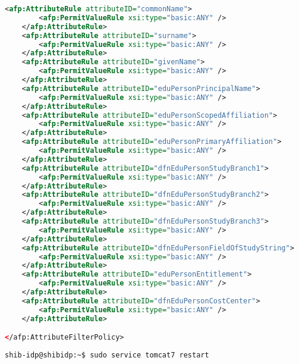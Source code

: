 \begin{lstlisting}[language=xml]
	<afp:AttributeRule attributeID="commonName">
		<afp:PermitValueRule xsi:type="basic:ANY" />
	</afp:AttributeRule>
	<afp:AttributeRule attributeID="surname">
		<afp:PermitValueRule xsi:type="basic:ANY" />
	</afp:AttributeRule>
	<afp:AttributeRule attributeID="givenName">
		<afp:PermitValueRule xsi:type="basic:ANY" />
	</afp:AttributeRule>
	<afp:AttributeRule attributeID="eduPersonPrincipalName">
		<afp:PermitValueRule xsi:type="basic:ANY" />
	</afp:AttributeRule>
	<afp:AttributeRule attributeID="eduPersonScopedAffiliation">
		<afp:PermitValueRule xsi:type="basic:ANY" />
	</afp:AttributeRule>
	<afp:AttributeRule attributeID="eduPersonPrimaryAffiliation">
		<afp:PermitValueRule xsi:type="basic:ANY" />
	</afp:AttributeRule>
	<afp:AttributeRule attributeID="dfnEduPersonStudyBranch1">
		<afp:PermitValueRule xsi:type="basic:ANY" />
	</afp:AttributeRule>
	<afp:AttributeRule attributeID="dfnEduPersonStudyBranch2">
		<afp:PermitValueRule xsi:type="basic:ANY" />
	</afp:AttributeRule>
	<afp:AttributeRule attributeID="dfnEduPersonStudyBranch3">
		<afp:PermitValueRule xsi:type="basic:ANY" />
	</afp:AttributeRule>
	<afp:AttributeRule attributeID="dfnEduPersonFieldOfStudyString">
		<afp:PermitValueRule xsi:type="basic:ANY" />
	</afp:AttributeRule>
	<afp:AttributeRule attributeID="eduPersonEntitlement">
		<afp:PermitValueRule xsi:type="basic:ANY" />
	</afp:AttributeRule>
	<afp:AttributeRule attributeID="dfnEduPersonCostCenter">
		<afp:PermitValueRule xsi:type="basic:ANY" />
	</afp:AttributeRule>

</afp:AttributeFilterPolicy>
\end{lstlisting}
\begin{lstlisting}
shib-idp@shibidp:~$ sudo service tomcat7 restart
\end{lstlisting}
